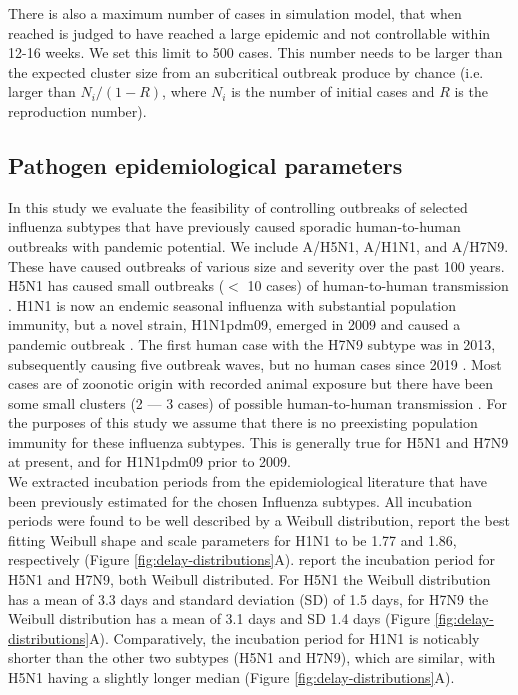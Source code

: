\documentclass{article}
\begin{document}
There is also a maximum number of cases in simulation model, that when reached is judged to have reached a large epidemic and not controllable within 12-16 weeks. We set this limit to 500 cases. This number needs to be larger than the expected cluster size from an subcritical outbreak produce by chance (i.e. larger than $N_i / (1 - R)$, where $N_i$ is the number of initial cases and $R$ is the reproduction number).

\subsection*{Pathogen epidemiological parameters} \label{epiparameters}

In this study we evaluate the feasibility of controlling outbreaks of selected influenza subtypes that have previously caused sporadic human-to-human outbreaks with pandemic potential. We include A/H5N1, A/H1N1, and A/H7N9. These have caused outbreaks of various size and severity over the past 100 years. H5N1 has caused small outbreaks ($<$ 10 cases) of human-to-human transmission \citep{yangDetectingHumanhumanTransmission2007a, aditamaAvianInfluenzaH5N12012a}. H1N1 is now an endemic seasonal influenza with substantial population immunity, but a novel strain, H1N1pdm09, emerged in 2009 and caused a pandemic outbreak \citep{fraserPandemicPotentialStrain2009, lesslerOutbreak2009Pandemic2009}. The first human case with the H7N9 subtype was in 2013, subsequently causing five outbreak waves, but no human cases since 2019 \citep{liH7N9InfluenzaVirus2021}. Most cases are of zoonotic origin with recorded animal exposure but there have been some small clusters (2 --- 3 cases) of possible human-to-human transmission \citep{liEpidemiologyHumanInfections2014}. For the purposes of this study we assume that there is no preexisting population immunity for these influenza subtypes. This is generally true for H5N1 and H7N9 at present, and for H1N1pdm09 prior to 2009. \\

We extracted incubation periods from the epidemiological literature that have been previously estimated for the chosen Influenza subtypes. All incubation periods were found to be well described by a Weibull distribution, \cite{nishiuraEstimationIncubationPeriod2011} report the best fitting Weibull shape and scale parameters for H1N1 to be 1.77 and 1.86, respectively (Figure \ref{fig:delay-distributions}A). \cite{cowlingComparativeEpidemiologyHuman2013} report the incubation period for H5N1 and H7N9, both Weibull distributed. For H5N1 the Weibull distribution has a mean of 3.3 days and standard deviation (SD) of 1.5 days, for H7N9 the Weibull distribution has a mean of 3.1 days and SD 1.4 days \citep{cowlingComparativeEpidemiologyHuman2013} (Figure \ref{fig:delay-distributions}A). Comparatively, the incubation period for H1N1 is noticably shorter than the other two subtypes (H5N1 and H7N9), which are similar, with H5N1 having a slightly longer median (Figure \ref{fig:delay-distributions}A).  \\
\end{document}
